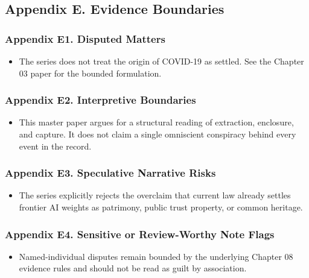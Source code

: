 \documentclass[
  american,
  11pt,
  letterpaper,
]{article}
\providecommand{\tightlist}{%
  \setlength{\itemsep}{0pt}\setlength{\parskip}{0pt}}
\begin{document}
\subsection{Appendix E. Evidence
Boundaries}\label{appendix-e.-evidence-boundaries}

\subsubsection{Appendix E1. Disputed
Matters}\label{appendix-e1.-disputed-matters}

\begin{itemize}
\tightlist
\item
  The series does not treat the origin of COVID-19 as settled. See the
  Chapter 03 paper for the bounded formulation.
\end{itemize}

\subsubsection{Appendix E2. Interpretive
Boundaries}\label{appendix-e2.-interpretive-boundaries}

\begin{itemize}
\tightlist
\item
  This master paper argues for a structural reading of extraction,
  enclosure, and capture. It does not claim a single omniscient
  conspiracy behind every event in the record.
\end{itemize}

\subsubsection{Appendix E3. Speculative Narrative
Risks}\label{appendix-e3.-speculative-narrative-risks}

\begin{itemize}
\tightlist
\item
  The series explicitly rejects the overclaim that current law already
  settles frontier AI weights as patrimony, public trust property, or
  common heritage.
\end{itemize}

\subsubsection{Appendix E4. Sensitive or Review-Worthy Note
Flags}\label{appendix-e4.-sensitive-or-review-worthy-note-flags}

\begin{itemize}
\tightlist
\item
  Named-individual disputes remain bounded by the underlying Chapter 08
  evidence rules and should not be read as guilt by association.
\end{itemize}
\end{document}
